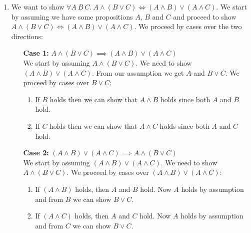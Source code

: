 \documentclass{tufte-handout}
\newcounter{exc:first:proof}
\begin{document}
\begin{enumerate}
\setcounter{enumi}{\value{exc:first:proof}}
\item We want to show
  $\forall A~B~C. ~A \land (B \lor C) \iff (A \land B) \lor (A
  \land C)$. We start by assuming we have some propositions $A$,
  $B$ and $C$ and proceed to show
  $A \land (B \lor C) \iff (A \land B) \lor (A \land C)$. We
  proceed by cases over the two directions:
  \begin{itemize}
  \item[\textbf{Case 1:}] $A \land (B \lor C) \implies (A \land B) \lor (A \land C)$\\
    We start by assuming $A \land (B \lor C)$. We need to
    show $(A \land B) \lor (A \land C)$.
    From our assumption we get $A$ and $B \lor C$. We proceed by
    cases over $B \lor C$:
    \begin{enumerate}
    \item If $B$ holds then we can show that $A \land B$ holds
      since both $A$ and $B$ hold.
    \item If $C$ holds then we can show that $A \land C$ holds
      since both $A$ and $C$ hold.
    \end{enumerate}

  \item[\textbf{Case 2:}]
    $(A \land B) \lor (A \land C) \implies A \land (B \lor C)$\\
    We start by assuming $(A \land B) \lor (A \land C)$. We need
    to show $A \land (B \lor C)$. We proceed by cases over
    $(A \land B) \lor (A \land C)$:
    \begin{enumerate}
    \item If $(A \land B)$ holds, then $A$ and $B$ hold. Now $A$
      holds by assumption and from $B$ we can show $B \lor C$.
    \item If $(A \land C)$ holds, then $A$ and $C$ hold. Now $A$
      holds by assumption and from $C$ we can show $B \lor C$.
    \end{enumerate}
  \end{itemize}

\end{enumerate}
\end{document}
